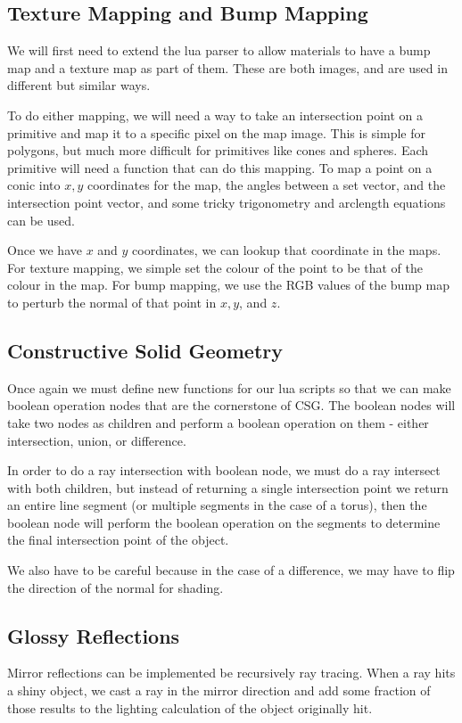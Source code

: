 \documentclass {article}
\begin{document}
\subsection{Texture Mapping and Bump Mapping}
We will first need to extend the lua parser to allow materials to have a bump
map and a texture map as part of them.  These are both images, and are used in
different but similar ways.

To do either mapping, we will need a way to take an intersection point on a
primitive and map it to a specific pixel on the map image.  This is simple for
polygons, but much more difficult for primitives like cones and spheres.  Each
primitive will need a function that can do this mapping.  To map a point on a
conic into $x,y$ coordinates for the map, the angles between a set vector, and
the intersection point vector, and some tricky trigonometry and arclength
equations can be used.

Once we have $x$ and $y$ coordinates, we can lookup that coordinate in the maps.
For texture mapping, we simple set the colour of the point to be that of the
colour in the map.  For bump mapping, we use the RGB values of the bump map to
perturb the normal of that point in $x, y$, and $z$.

\subsection{Constructive Solid Geometry}
Once again we must define new functions for our lua scripts so that we can make
boolean operation nodes that are the cornerstone of CSG.  The boolean nodes will
take two nodes as children and perform a boolean operation on them - either
intersection, union, or difference.

In order to do a ray intersection with boolean node, we must do a ray intersect
with both children, but instead of returning a single intersection point we
return an entire line segment (or multiple segments in the case of a torus),
then the boolean node will perform the boolean operation on the segments to
determine the final intersection point of the object.

We also have to be careful because in the case of a difference, we may
have to flip the direction of the normal for shading.

\subsection{Glossy Reflections}
Mirror reflections can be implemented be recursively ray tracing.  When a ray
hits a shiny object, we cast a ray in the mirror direction and add some fraction
of those results to the lighting calculation of the object originally hit.
\end{document}
